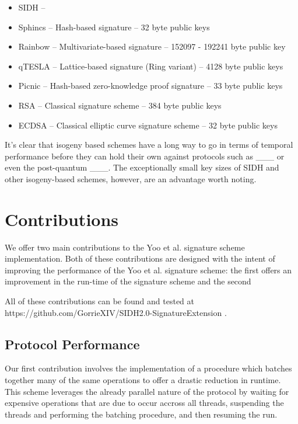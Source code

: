 \begin{itemize}
\item SIDH --
\item Sphincs -- Hash-based signature -- 32 byte public keys
\item Rainbow -- Multivariate-based signature -- 152097 - 192241 byte public key
\item qTESLA -- Lattice-based signature (Ring variant) -- 4128 byte public keys
\item Picnic -- Hash-based zero-knowledge proof signature -- 33 byte public keys
\item RSA -- Classical signature scheme --  384 byte public keys
\item ECDSA -- Classical elliptic curve signature scheme -- 32 byte public keys
\end{itemize}

It's clear that isogeny based schemes have a long way to go in terms of temporal performance before they can hold their own against protocols such as \_\_\_ or even the post-quantum \_\_\_. The exceptionally small key sizes of SIDH and other isogeny-based schemes, however, are an advantage worth noting. 

\section{Contributions}

We offer two main contributions to the Yoo et al. signature scheme implementation. Both of these contributions are designed with the intent of improving the performance of the Yoo et al. signature scheme: the first offers an improvement in the run-time of the signature scheme and the second 

All of these contributions can be found and tested at https://github.com/GorrieXIV/SIDH2.0-SignatureExtension .

\subsection{Protocol Performance}

Our first contribution involves the implementation of a procedure which batches together many of the same operations to offer a drastic reduction in runtime. This scheme leverages the already parallel nature of the protocol by waiting for expensive operations that are due to occur accross all threads, suspending the threads and performing the batching procedure, and then resuming the run.


